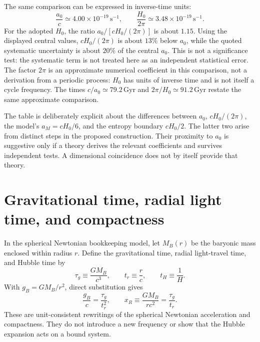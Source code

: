 \documentclass[12pt]{article}
\begin{document}
The same comparison can be expressed in inverse-time units:
\begin{equation}
  \frac{a_0}{c}\simeq4.00\times10^{-19}\,\mathrm{s^{-1}},
  \qquad
  \frac{H_0}{2\pi}\simeq3.48\times10^{-19}\,\mathrm{s^{-1}}.
  \label{eq:rate-coincidence}
\end{equation}
For the adopted $H_0$, the ratio $a_0/[cH_0/(2\pi)]$ is about $1.15$. Using the displayed central values, $cH_0/(2\pi)$ is about $13\%$ below $a_0$, while the quoted systematic uncertainty is about $20\%$ of the central $a_0$. This is not a significance test: the systematic term is not treated here as an independent statistical error. The factor $2\pi$ is an approximate numerical coefficient in this comparison, not a derivation from a periodic process: $H_0$ has units of inverse time and is not itself a cycle frequency. The times $c/a_0\simeq79.2\,\mathrm{Gyr}$ and $2\pi/H_0\simeq91.2\,\mathrm{Gyr}$ restate the same approximate comparison.

The table is deliberately explicit about the differences between $a_0$, $cH_0/(2\pi)$, the model's $a_M=cH_0/6$, and the entropy boundary $cH_0/2$. The latter two arise from distinct steps in the proposed construction. Their proximity to $a_0$ is suggestive only if a theory derives the relevant coefficients and survives independent tests. A dimensional coincidence does not by itself provide that theory.

\section{Gravitational time, radial light time, and compactness}
\label{sec:identities}

In the spherical Newtonian bookkeeping model, let $M_B(r)$ be the baryonic mass enclosed within radius $r$. Define the gravitational time, radial light-travel time, and Hubble time by
\begin{equation}
  \tau_g\equiv\frac{GM_B}{c^3},
  \qquad
  t_r\equiv\frac{r}{c},
  \qquad
  t_H\equiv\frac{1}{H}.
  \label{eq:times}
\end{equation}
With $g_B=GM_B/r^2$, direct substitution gives
\begin{equation}
  \frac{g_B}{c}=\frac{\tau_g}{t_r^2},
  \qquad
  x_R\equiv\frac{GM_B}{rc^2}=\frac{\tau_g}{t_r}.
  \label{eq:time-identities}
\end{equation}
These are unit-consistent rewritings of the spherical Newtonian acceleration and compactness. They do not introduce a new frequency or show that the Hubble expansion acts on a bound system.
\end{document}
